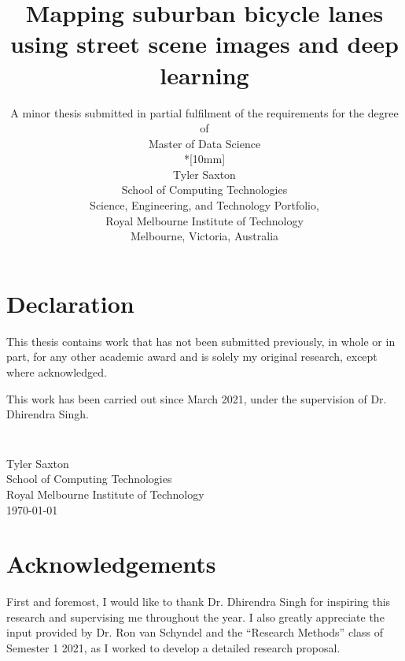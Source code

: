 \documentclass[11pt,twoside]{report}
\newcommand{\SubmissionDate}{\today}
\newcommand{\student}{Tyler Saxton}
\newcommand{\supervisor}{Dr. Dhirendra Singh}
\newcommand{\topic}{Mapping suburban bicycle lanes using street scene images and deep learning}
\newcommand{\school}{School of Computing Technologies}
\newcommand{\program}{Master of Data Science}
\newcommand{\institution}{Royal Melbourne Institute of Technology}
\begin{document}
\title{{\Large\bf \topic}}
\author{
A minor thesis submitted in partial fulfilment of the requirements for the degree of
\\\program\\*[10mm]
\\\student
\\\school
\\Science, Engineering, and Technology Portfolio,
\\\institution
\\Melbourne, Victoria, Australia
}
\maketitle
\thispagestyle{empty}


\chapter*{Declaration}

This thesis contains work that has not been submitted previously, in
whole or in part, for any other academic award and is solely my
original research, except where acknowledged.

This work has been carried out since March 2021, under the
supervision of {\supervisor}.

\paragraph{}
\vspace{5cm}\noindent \\\student \\
\school\\
\institution\\
\SubmissionDate



\chapter*{Acknowledgements}

First and foremost, I would like to thank Dr. Dhirendra Singh for inspiring this research and supervising me throughout the year.  I also greatly appreciate the input provided by Dr. Ron van Schyndel and the ``Research Methods'' class of Semester 1 2021, as I worked to develop a detailed research proposal. \\
\end{document}
